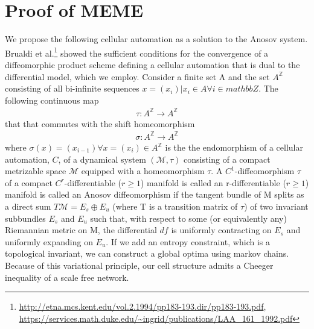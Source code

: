 \documentclass{article}
\begin{document}
\section{Proof of MEME}
We propose the following cellular automation as a solution to the Anosov system. Brualdi et al.\footnote{\url{http://etna.mcs.kent.edu/vol.2.1994/pp183-193.dir/pp183-193.pdf}, \url{https://services.math.duke.edu/~ingrid/publications/LAA_161_1992.pdf}} showed the sufficient conditions for the convergence of a diffeomorphic product scheme defining a cellular automation that is dual to the differential model, which we employ. Consider a finite set A and the set $A^{\mathbb{Z}}$ consisting of all bi-infinite sequences $x = (x_i) | x_i \in A \forall i \in mathbb{Z}$. The following continuous map
\begin{equation} \label{eq1}
\begin{split}
\tau: A^{\mathbb{Z}} \rightarrow A^{\mathbb{Z}} 
\end{split}
\end{equation}
that that commutes with the shift homeomorphism
\begin{equation} \label{eq1}
\begin{split}
\sigma: A^{\mathbb{Z}} \rightarrow A^{\mathbb{Z}} 
\end{split}
\end{equation}
where $\sigma(x) = (x_{i-1}) \forall x = (x_i) \in A^{\mathbb{Z}}$ is the the endomorphism of a cellular automation, $C$, of a dynamical system $(\mathcal{M}, \tau)$ consisting of a compact metrizable space $\mathcal{M}$ equipped with a homeomorphism $\tau$. A $C^1$-diffeomorphism $\tau$ of a compact $C^r$-differentiable ($r \geq 1$) manifold  is called an r-differentiable ($r \geq 1$) manifold is called an Anosov diffeomorphism if the tangent bundle of M splits as a direct sum $T\mathcal{M} = E_s\oplus E_u$ (where T is a transition matrix of $\tau$) of two invariant subbundles $E_s$ and $E_u$ such that, with respect to some (or equivalently any) Riemannian metric on M, the differential $df$ is uniformly contracting on $E_s$ and uniformly expanding on $E_u$. If we add an entropy constraint, which is a topological invariant, we can construct a global optima using markov chains. Because of this variational principle, our cell structure admits a Cheeger inequality of a scale free network.
\end{document}
